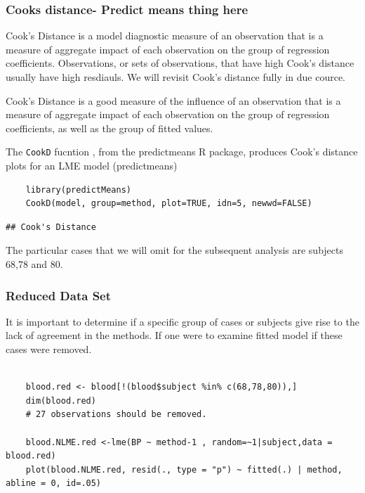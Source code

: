 \documentclass[12pt, a4paper]{report}
\theoremstyle{plain}
\theoremstyle{definition}
\theoremstyle{remark}
\begin{document}
\subsubsection{Cooks distance- Predict means thing here}
Cook's Distance is a model diagnostic measure of an observation that is a measure of aggregate impact of each observation on the group of regression coefficients. Observations, or sets of observations, that have high Cook's distance usually have high resdiauls. We will revisit Cook's distance fully in due cource.

Cook's Distance is a good measure of the influence of an observation that is a measure of aggregate impact of each observation on the group of regression coefficients, as well as the group of fitted values.

The \texttt{CookD} fucntion , from the predictmeans R package, produces Cook’s distance plots for an LME model 
(predictmeans)



\begin{framed}
	\begin{verbatim}
	library(predictMeans)
	CookD(model, group=method, plot=TRUE, idn=5, newwd=FALSE)
	\end{verbatim}
\end{framed}


\begin{verbatim}
## Cook's Distance

\end{verbatim}

The particular cases that we will omit for the subsequent analysis are subjects 68,78 and 80.

\subsubsection{Reduced Data Set}
It is important to determine if a specific group of cases or subjects give rise to the lack of agreement in the methods. If one were to examine fitted model if these cases were removed.

\begin{framed}
	\begin{verbatim}
	
	blood.red <- blood[!(blood$subject %in% c(68,78,80)),]
	dim(blood.red)
	# 27 observations should be removed.
	
	blood.NLME.red <-lme(BP ~ method-1 , random=~1|subject,data = blood.red)
	plot(blood.NLME.red, resid(., type = "p") ~ fitted(.) | method, abline = 0, id=.05)
	\end{verbatim}
\end{framed}
\end{document}
